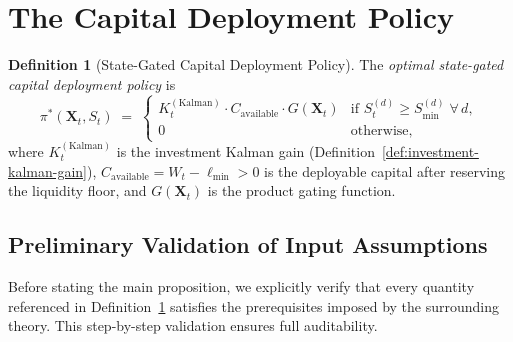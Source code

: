 \documentclass[12pt,openany]{book}
\numberwithin{equation}{chapter}
\theoremstyle{plain}
\theoremstyle{definition}
\newtheorem{definition}[theorem]{Definition}
\theoremstyle{remark}
\def\mathcal#1{#1}%
\begin{document}
\section{The Capital Deployment Policy}

\begin{definition}[State-Gated Capital Deployment Policy]
\label{def:deployment-policy}
The \emph{optimal state-gated capital deployment policy} is
\begin{equation}
  \pi^*(\mathbf{X}_t, S_t) \;=\;
  \begin{cases}
    K_t^{(\mathrm{Kalman})} \cdot C_{\mathrm{available}}
    \cdot G(\mathbf{X}_t) &
    \text{if } \mathcal{S}_t^{(d)} \geq \mathcal{S}_{\min}^{(d)}
    \;\forall\, d, \\
    0 & \text{otherwise},
  \end{cases}
  \label{eq:deployment-policy}
\end{equation}
where $K_t^{(\mathrm{Kalman})}$ is the investment Kalman gain
(Definition~\ref{def:investment-kalman-gain}),
$C_{\mathrm{available}} = W_t - \ell_{\min} > 0$ is the
deployable capital after reserving the liquidity floor, and
$G(\mathbf{X}_t)$ is the product gating function.
\end{definition}

\subsection*{Preliminary Validation of Input Assumptions}

Before stating the main proposition, we explicitly verify that
every quantity referenced in Definition~\ref{def:deployment-policy}
satisfies the prerequisites imposed by the surrounding theory.
This step-by-step validation ensures full auditability.
\end{document}
